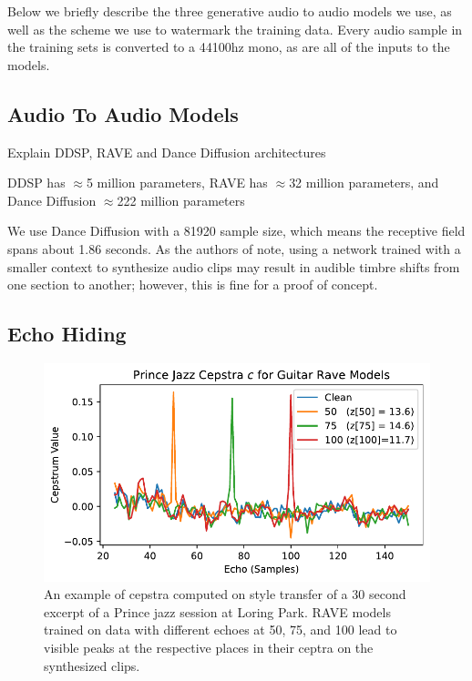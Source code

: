 \documentclass[letterpaper]{article} %
\begin{document}
Below we briefly describe the three generative audio to audio models we use, as well as the scheme we use to watermark the training data. Every audio sample in the training sets is converted to a 44100hz mono, as are all of the inputs to the models.

\subsection{Audio To Audio Models}

Explain DDSP, RAVE and Dance Diffusion architectures

DDSP has $\approx$5 million parameters, RAVE has $\approx$32 million parameters, and Dance Diffusion $\approx$222 million parameters

We use Dance Diffusion with a 81920 sample size, which means the receptive field spans about 1.86 seconds.  As the authors of \cite{hawthornemulti} note, using a network trained with a smaller context to synthesize audio clips may result in audible timbre shifts from one section to another; however, this is fine for a proof of concept.


\subsection{Echo Hiding}
\label{sec:echohiding}

\begin{figure}
    \centering
    \includegraphics[width=\columnwidth]{figs/RaveCepstra.pdf}
    \caption{An example of cepstra computed on style transfer of a 30 second excerpt of a Prince jazz session at Loring Park.  RAVE models trained on data with different echoes at 50, 75, and 100 lead to visible peaks at the respective places in their ceptra on the synthesized clips.}
    \label{fig:ravecepstra}
\end{figure}
\end{document}

